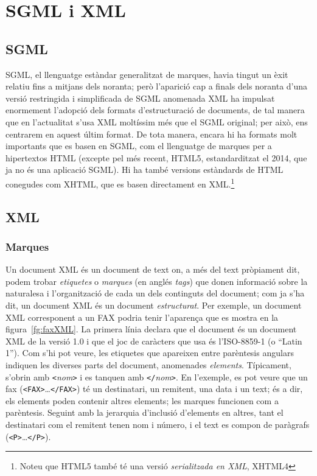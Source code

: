 \section{SGML i XML}
\label{s3:SGML}
\label{ss:SGML}

\subsection{SGML}

SGML, el llenguatge estàndar generalitzat de marques, havia tingut un
èxit relatiu fins a mitjans dels noranta; però l'aparició cap a finals
dels noranta d'una versió restringida i simplificada de SGML anomenada
XML ha impulsat enormement l'adopció dels formats d'estructuració de
documents, de tal manera que en l'actualitat s'usa XML moltíssim més
que el SGML original; per això, ens centrarem en aquest últim
format. De tota manera, encara hi ha formats molt importants que es
basen en SGML, com el llenguatge de marques per a hipertextos HTML
(excepte pel més recent, HTML5, estandarditzat el 2014, que ja no és
una aplicació SGML). Hi ha també versions estàndards de HTML conegudes
com XHTML, que es basen directament en XML.\footnote{Noteu que
  HTML5 també té una versió \emph{serialitzada en XML}, XHTML4}

\subsection{XML}
\label{s3:XML}

\subsubsection{Marques}

Un document XML és un document de text on, a més del text pròpiament
dit, podem trobar \emph{etiquetes} o \emph{marques} (en anglés
\emph{tags}) que donen informació sobre la naturalesa i l'organització
de cada un dels continguts del document; com ja s'ha dit, un document
XML és un document \emph{estructurat}. Per exemple, un document XML
corresponent a un FAX podria tenir l'aparença que es mostra en la
figura~\ref{fg:faxXML}.  La primera línia declara que el document és
un document XML de la versió 1.0 i que el joc de caràcters que usa és
l'ISO-8859-1 (o ``Latin 1''). Com s'hi pot veure, les etiquetes que
apareixen entre parèntesis angulars indiquen les diverses parts del
document, anomenades \emph{elements}.  Típicament, s'obrin amb
\texttt{<}\emph{nom}\texttt{>} i es tanquen amb
\texttt{</}\emph{nom}\texttt{>}.  En l'exemple, es pot veure que un
fax (\texttt{<FAX>}\ldots\texttt{</FAX>}) té un destinatari, un
remitent, una data i un text; és a dir, els elements poden contenir
altres elements; les marques funcionen com a parèntesis. Seguint amb
la jerarquia d'inclusió d'elements en altres, tant el destinatari com
el remitent tenen nom i número, i el text es compon de paràgrafs
(\texttt{<P>}\ldots\texttt{</P>}).

